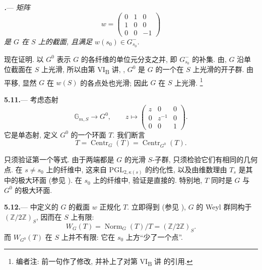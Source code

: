 \par\medskip\noindent
{}\textbf{\textit{.}}---
\textit{矩阵}
\[
  w=
  \begin{pmatrix}
    0&1&0\\
    1&0&0\\
    0&0&-1
  \end{pmatrix}
\]
\textit{是 \(G\) 在 \(S\) 上的截面, 且满足 \(w(s_0)\in G^-_{s_0}\).}

现在证明. 以 \(G^0\) 表示 \(G\) 的各纤维的单位元分支之并, 即 \(G^-_{s_0}\) 的补集. 由, \(G\) 沿单位截面在 \(S\) 上光滑, 所以由第 VI\textsubscript{B} 讲, , \(G^0\) 是 \(G\) 的一个在 \(S\) 上光滑的开子群. 由平移, 显然 \(G\) 在 \(w(S)\) 的各点处也光滑; 因此 \(G\) 在 \(S\) 上光滑.
\footnote{编者注: 前一句作了修改, 并补上了对第 VI\textsubscript{B} 讲  的引用.}

\par\medskip\noindent
\textbf{5.11.}---
考虑态射
\[
  \mathbb G_{m,S}\longrightarrow G^0,
  \qquad
  z\longmapsto
  \begin{pmatrix}
    z&0&0\\
    0&z^{-1}&0\\
    0&0&1
  \end{pmatrix}.
\]
它是单态射, 定义 \(G^0\) 的一个环面 \(T\). 我们断言
\[
  T=\operatorname{Centr}_G(T)
   =\operatorname{Centr}_{G^0}(T).
\]

只须验证第一个等式. 由于两端都是 \(G\) 的光滑 \(S\)-子群, 只须检验它们有相同的几何点. 在 \(s\ne s_0\) 上的纤维中, 这来自 \(\mathrm{PGL}_{2,\kappa(s)}\) 的约化性, 以及由维数理由 \(T_s\) 是其中的极大环面 \textup{(参见 )}. 在 \(s_0\) 上的纤维中, 验证是直接的. 特别地, \(T\) 同时是 \(G\) 与 \(G^0\) 的极大环面.

\par\medskip\noindent
\textbf{5.12.}---
 中定义的 \(G\) 的截面 \(w\) 正规化 \(T\). 立即得到 \textup{(参见 )}, \(G\) 的 Weyl 群同构于 \((\mathbb Z/2\mathbb Z)_S\), 因而在 \(S\) 上有限:
\[
  W_G(T)=\operatorname{Norm}_G(T)/T
        =(\mathbb Z/2\mathbb Z)_S.
\]
而 \(W_{G^0}(T)\) 在 \(S\) 上并不有限: 它在 \(s_0\) 上方“少了一个点”.

